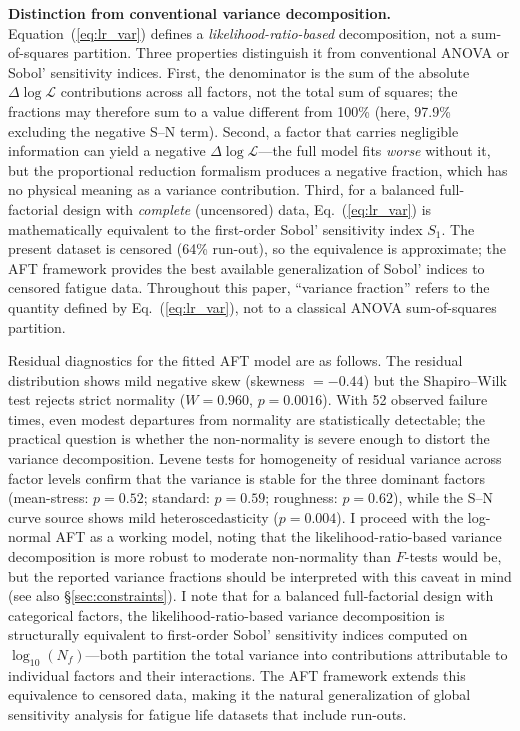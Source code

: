 \documentclass[12pt,a4paper]{article}
\begin{document}
\textbf{Distinction from conventional variance decomposition.}
Equation~(\ref{eq:lr_var}) defines a \emph{likelihood-ratio-based}
decomposition, not a sum-of-squares partition. Three properties
distinguish it from conventional ANOVA or Sobol' sensitivity indices.
First, the denominator is the sum of the absolute
$\Delta\log\mathcal{L}$ contributions across all factors, not the
total sum of squares; the fractions may therefore sum to a value
different from 100\% (here, 97.9\% excluding the negative S--N
term). Second, a factor that carries negligible information can
yield a negative $\Delta\log\mathcal{L}$---the full model fits
\emph{worse} without it, but the proportional reduction formalism
produces a negative fraction, which has no physical meaning as a
variance contribution. Third, for a balanced full-factorial design
with \emph{complete} (uncensored) data, Eq.~(\ref{eq:lr_var}) is
mathematically equivalent to the first-order Sobol' sensitivity
index $S_1$. The present dataset is censored (64\% run-out), so
the equivalence is approximate; the AFT framework provides the
best available generalization of Sobol' indices to censored fatigue
data. Throughout this paper, ``variance fraction'' refers to the
quantity defined by Eq.~(\ref{eq:lr_var}), not to a classical ANOVA
sum-of-squares partition.

Residual diagnostics for the fitted AFT model are as follows.
The residual distribution shows mild negative skew (skewness
$=-0.44$) but the Shapiro--Wilk test rejects strict normality
($W=0.960$, $p=0.0016$). With 52 observed failure times, even
modest departures from normality are statistically detectable;
the practical question is whether the non-normality is severe
enough to distort the variance decomposition. Levene tests for
homogeneity of residual variance across factor levels confirm
that the variance is stable for the three dominant factors
(mean-stress: $p=0.52$; standard: $p=0.59$; roughness:
$p=0.62$), while the S--N curve source shows mild
heteroscedasticity ($p=0.004$). I proceed with the log-normal
AFT as a working model, noting that the likelihood-ratio-based
variance decomposition is more robust to moderate non-normality
than $F$-tests would be, but the reported variance fractions
should be interpreted with this caveat in mind (see also
\S\ref{sec:constraints}). I note that for a balanced full-factorial
design with categorical factors, the likelihood-ratio-based variance
decomposition is structurally equivalent to first-order Sobol'
sensitivity indices computed on $\log_{10}(N_f)$---both partition the
total variance into contributions attributable to individual factors
and their interactions. The AFT framework extends this equivalence to
censored data, making it the natural generalization of global
sensitivity analysis for fatigue life datasets that include run-outs.
\end{document}
